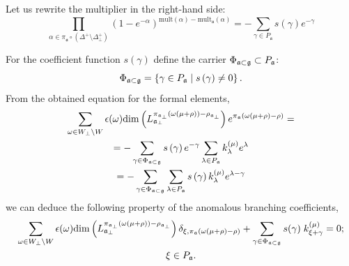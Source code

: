 \documentclass[a4paper,12pt]{article}
\theoremstyle{definition} \newtheorem{Def}{Definition}
\begin{document}
Let us rewrite the multiplier in the right-hand side:
\begin{equation}
  \label{eq:11}
    \prod_{\alpha\in \pi_{\mathfrak{a}}\circ (\Delta^{+}\setminus \Delta^{+}_{\bot})} \left(1-e^{-\alpha}\right)^{\mathrm{mult}(\alpha)-\mathrm{mult}_{\mathfrak{a}}(\alpha)}=
     -\sum_{\gamma\in P_{\mathfrak{a}}} s(\gamma)e^{-\gamma}
\end{equation}

For the coefficient function $s\left( \gamma \right) $ define the carrier $\Phi _{\frak{a%
}\subset \frak{g}}\subset P_{\frak{a}}$:
\begin{equation}
\Phi _{\frak{a}\subset \frak{g}}=\left\{ \gamma \in P_{\frak{a}}\mid s\left(
\gamma \right) \neq 0\right\} .  \label{phi-d}
\end{equation}
From the obtained equation for the formal elements,
\begin{multline}
  \label{eq:16}
  \sum_{\omega\in W_{\bot}\backslash W} \epsilon(\omega) \mathrm{dim}\left(L^{\pi_{\mathfrak{a}_{\bot}}(\omega(\mu+\rho))-\rho_{\mathfrak{a}_{\bot}}}_{\mathfrak{a}_{\bot}}\right) e^{\pi_{\mathfrak{a}}(\omega(\mu+\rho)-\rho)}=\\
  = -\sum_{\gamma \in \Phi _{\frak{a}\subset \frak{g}}} s\left( \gamma \right) e^{-\gamma }\sum_{\lambda \in P_{\frak{a}}}
  k_{\lambda }^{\left( \mu \right) }e^{\lambda } \\
  =-\sum_{\gamma \in \Phi _{\frak{a}\subset \frak{g}}}\sum_{\lambda \in P_{\frak{a}}}s\left( \gamma \right) k_{\lambda }^{\left( \mu \right)}e^{\lambda -\gamma }
\end{multline}
we can deduce the following property of the anomalous branching coefficients,
\begin{multline}
  \label{eq:17}
   \sum_{\omega\in W_{\bot}\backslash W} \epsilon(\omega) \mathrm{dim}\left(L^{\pi_{\mathfrak{a}_{\bot}}(\omega(\mu+\rho))-\rho_{\mathfrak{a}_{\bot}}}_{\mathfrak{a}_{\bot}}\right) \delta_{\xi,\pi_{\mathfrak{a}}(\omega(\mu+\rho)-\rho)}+
   \sum_{\gamma \in \Phi _{\frak{a}\subset \frak{g}}} s(\gamma)\; k^{(\mu)}_{\xi+\gamma}=0;\\ \xi\in P_{\mathfrak{a}}.
\end{multline}
\end{document}
